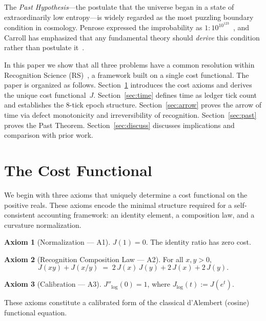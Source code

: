 \documentclass[12pt,a4paper]{article}
\theoremstyle{definition}
\newtheorem{axiom_rs}{Axiom}
\theoremstyle{remark}
\begin{document}
The \emph{Past Hypothesis}---the postulate that the universe began in a
state of extraordinarily low entropy---is widely regarded as the most
puzzling boundary condition in cosmology.  Penrose expressed the improbability
as $1:10^{10^{123}}$~\cite{Penrose1989}, and Carroll has emphasized that any
fundamental theory should \emph{derive} this condition rather than
postulate it~\cite{Carroll2010}.

In this paper we show that all three problems have a common resolution
within Recognition Science (RS)~\cite{RS_Axioms}, a framework built on
a single cost functional.  The paper is organized as follows.  Section~\ref{sec:cost}
introduces the cost axioms and derives the unique cost functional~$J$.
Section~\ref{sec:time} defines time as ledger tick count and establishes
the 8-tick epoch structure.  Section~\ref{sec:arrow} proves the arrow of
time via defect monotonicity and irreversibility of recognition.
Section~\ref{sec:past} proves the Past Theorem.  Section~\ref{sec:discuss}
discusses implications and comparison with prior work.

\section{The Cost Functional}
\label{sec:cost}

We begin with three axioms that uniquely determine a cost functional on the
positive reals.  These axioms encode the minimal structure required for a
self-consistent accounting framework: an identity element, a composition law,
and a curvature normalization.

\begin{axiom_rs}[Normalization --- A1]
\label{ax:norm}
$J(1) = 0$. \quad The identity ratio has zero cost.
\end{axiom_rs}

\begin{axiom_rs}[Recognition Composition Law --- A2]
\label{ax:rcl}
For all $x, y > 0$,
\[
  J(xy) + J(x/y) \;=\; 2\,J(x)\,J(y) + 2\,J(x) + 2\,J(y).
\]
\end{axiom_rs}

\begin{axiom_rs}[Calibration --- A3]
\label{ax:cal}
$J''_{\log}(0) = 1$, \quad where $J_{\log}(t) := J(e^t)$.
\end{axiom_rs}

These axioms constitute a calibrated form of the classical d'Alembert
(cosine) functional equation.
\end{document}
